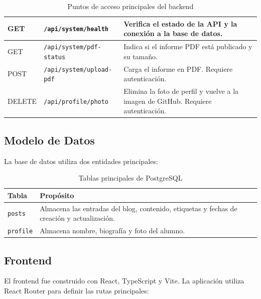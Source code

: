 \documentclass[twoside, 11pt, a4paper]{article}
\begin{document}
\begin{table}[H]
\begin{tabular}{|l|l|p{7cm}|}
            \hline
            GET & \texttt{/api/system/health} & Verifica el estado de la API y la conexión a la base de datos. \\
            \hline
            GET & \texttt{/api/system/pdf-status} & Indica si el informe PDF está publicado y su tamaño. \\
            \hline
            POST & \texttt{/api/system/upload-pdf} & Carga el informe en PDF. Requiere autenticación. \\
            \hline
            DELETE & \texttt{/api/profile/photo} & Elimina la foto de perfil y vuelve a la imagen de GitHub. Requiere autenticación. \\
            \hline
        \end{tabular}
        \caption{Puntos de acceso principales del backend}
    \end{table}

    \subsection{Modelo de Datos}

    La base de datos utiliza dos entidades principales:

    \begin{table}[H]
        \centering
        \begin{tabular}{|l|p{9cm}|}
            \hline
            \textbf{Tabla} & \textbf{Propósito} \\
            \hline
            \texttt{posts} & Almacena las entradas del blog, contenido, etiquetas y fechas de creación y actualización. \\
            \hline
            \texttt{profile} & Almacena nombre, biografía y foto del alumno. \\
            \hline
        \end{tabular}
        \caption{Tablas principales de PostgreSQL}
    \end{table}

    \subsection{Frontend}

    El frontend fue construido con React, TypeScript y Vite. La aplicación utiliza React Router para definir las rutas principales:
\end{document}
